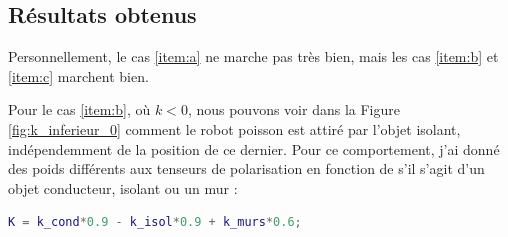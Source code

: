 \subsection{Résultats obtenus}

Personnellement, le cas \ref{item:a} ne marche pas très bien, mais les cas \ref{item:b} et \ref{item:c} marchent bien. \vspace{0.2cm}

Pour le cas \ref{item:b}, où $k < 0$, nous pouvons voir dans la Figure \ref{fig:k_inferieur_0} comment le robot poisson est attiré par l'objet isolant, indépendemment de la position de ce dernier. 
Pour ce comportement, j'ai donné des poids différents aux tenseurs de polarisation en fonction de s'il s'agit d'un objet conducteur, isolant ou un mur :
\begin{lstlisting}[language=matlab, caption={Extrait du fichier \mcode{f_currents.m}}, firstnumber = 77, aboveskip=-0.6 \baselineskip, belowskip=-0.4 \baselineskip]
K = k_cond*0.9 - k_isol*0.9 + k_murs*0.6;
\end{lstlisting}

